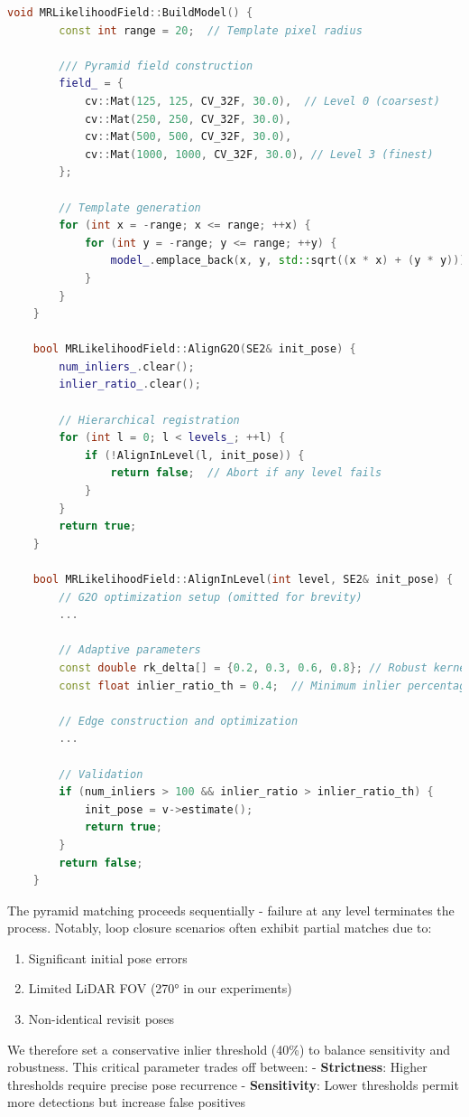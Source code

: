 \begin{lstlisting}[language=c++,caption=src/ch6/multi_resolution_likelihood_field.cc]
	void MRLikelihoodField::BuildModel() {
		const int range = 20;  // Template pixel radius
		
		/// Pyramid field construction
		field_ = {
			cv::Mat(125, 125, CV_32F, 30.0),  // Level 0 (coarsest)
			cv::Mat(250, 250, CV_32F, 30.0),
			cv::Mat(500, 500, CV_32F, 30.0),
			cv::Mat(1000, 1000, CV_32F, 30.0), // Level 3 (finest)
		};
		
		// Template generation
		for (int x = -range; x <= range; ++x) {
			for (int y = -range; y <= range; ++y) {
				model_.emplace_back(x, y, std::sqrt((x * x) + (y * y)));
			}
		}
	}
	
	bool MRLikelihoodField::AlignG2O(SE2& init_pose) {
		num_inliers_.clear();
		inlier_ratio_.clear();
		
		// Hierarchical registration
		for (int l = 0; l < levels_; ++l) {
			if (!AlignInLevel(l, init_pose)) {
				return false;  // Abort if any level fails
			}
		}
		return true;
	}
	
	bool MRLikelihoodField::AlignInLevel(int level, SE2& init_pose) {
		// G2O optimization setup (omitted for brevity)
		...
		
		// Adaptive parameters
		const double rk_delta[] = {0.2, 0.3, 0.6, 0.8}; // Robust kernel thresholds
		const float inlier_ratio_th = 0.4;  // Minimum inlier percentage
		
		// Edge construction and optimization
		...
		
		// Validation
		if (num_inliers > 100 && inlier_ratio > inlier_ratio_th) {
			init_pose = v->estimate();
			return true;
		}
		return false;
	}
\end{lstlisting}

The pyramid matching proceeds sequentially - failure at any level terminates the process. Notably, loop closure scenarios often exhibit partial matches due to:  

\begin{enumerate}
\item  Significant initial pose errors  
\item  Limited LiDAR FOV (270° in our experiments)  
\item  Non-identical revisit poses 
\end{enumerate}
 

We therefore set a conservative inlier threshold (40\%) to balance sensitivity and robustness. This critical parameter trades off between:  
- \textbf{Strictness}: Higher thresholds require precise pose recurrence  
- \textbf{Sensitivity}: Lower thresholds permit more detections but increase false positives  

